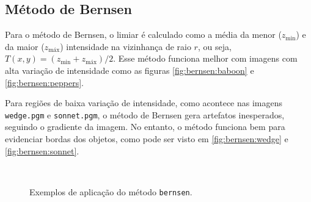 \subsection{Método de Bernsen}

Para o método de Bernsen, o limiar é calculado como a média da menor ($z_\text{min}$) e da maior ($z_\text{máx}$) intensidade na vizinhança de raio $r$, ou seja, $T(x, y) = \left(z_\text{min} + z_\text{máx}\right) / 2$. Esse método funciona melhor com imagens com alta variação de intensidade como as figuras \ref{fig:bernsen:baboon} e \ref{fig:bernsen:peppers}.

Para regiões de baixa variação de intensidade, como acontece nas imagens \texttt{wedge.pgm} e \texttt{sonnet.pgm}, o método de Bernsen gera artefatos inesperados, seguindo o gradiente da imagem. No entanto, o método funciona bem para evidenciar bordas dos objetos, como pode ser visto em \ref{fig:bernsen:wedge} e \ref{fig:bernsen:sonnet}.

\begin{figure}[H]
    \centering
    \\[8pt]

    \caption{Exemplos de aplicação do método \texttt{bernsen}.}
    \label{fig:bernsen}
\end{figure}